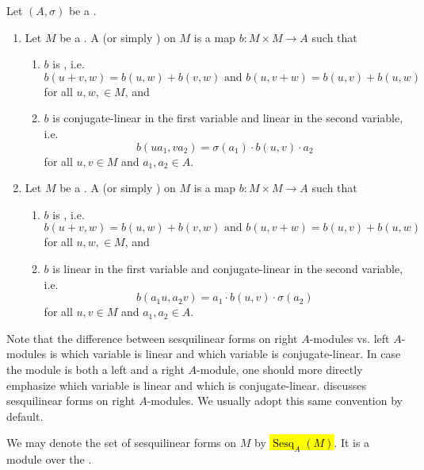 \begin{definition} \label{definition:sesquilinear_form_on_a_module_over_a_ring_with_involution}
Let $(A, \sigma)$ be a . 
\begin{enumerate}
    \item Let $M$ be a .
    A  (or simply ) on $M$ is a map $b: M \times M \to A$ such that
    \begin{enumerate}
        \item $b$ is , i.e.
        $$b(u + v, w) = b(u, w) + b(v, w) \text{ and } b(u, v + w) = b(u, v) + b(u, w)$$
        for all $u,w, \in M$, and 
        \item $b$ is conjugate-linear in the first variable and linear in the second variable, i.e. 
        $$b(ua_1, va_2) = \sigma(a_1) \cdot b(u,v) \cdot a_2$$
        for all $u,v \in M$ and $a_1,a_2 \in A$.
    \end{enumerate}

    \item Let $M$ be a . A  (or simply ) on $M$ is a map $b: M \times M \to A$ such that
    \begin{enumerate}
        \item $b$ is , i.e.
        $$b(u + v, w) = b(u, w) + b(v, w) \text{ and } b(u, v + w) = b(u, v) + b(u, w)$$
        for all $u,w, \in M$, and 
        \item $b$ is linear in the first variable and conjugate-linear in the second variable, i.e. 
        $$b(a_1u, a_2v) = a_1 \cdot b(u,v) \cdot \sigma(a_2)$$
        for all $u,v \in M$ and $a_1,a_2 \in A$.
    \end{enumerate}
\end{enumerate}
Note that the difference between sesquilinear forms on right $A$-modules vs. left $A$-modules is which variable is linear and which variable is conjugate-linear. In case the module is both a left and a right $A$-module, one should more directly emphasize which variable is linear and which is conjugate-linear.
\cite{knus_qhfr} discusses sesquilinear forms on right $A$-modules. We usually adopt this same convention by default.

We may denote the set of sesquilinear forms on $M$ by \hl{$\operatorname{Sesq}_A(M)$}. It is a module over the .
\end{definition}